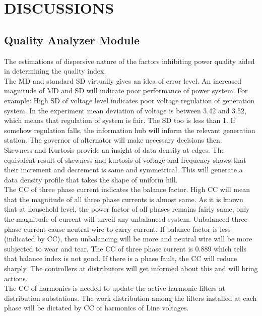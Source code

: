 \documentclass[a4paper,12pt,oneside]{book}
\begin{document}
\chapter{DISCUSSIONS} \label{chap:disc}
\label{sec:discussion}

\section*{Quality Analyzer Module}
The estimations of dispersive nature of the factors inhibiting power quality aided in determining the quality index.\\
The MD and standard SD virtually gives an idea of error level. An increased magnitude of MD and SD will indicate poor performance of power system. For example: High SD of voltage level indicates poor voltage regulation of generation system.  In the experiment mean deviation of voltage is between 3.42 and 3.52, which  means that regulation of system is fair. The SD too is less than 1. If somehow regulation falls, the information hub will inform the relevant generation station. The governor of alternator will make necessary decisions then.\\
Skewness and Kurtosis provide an insight of data density at edges. The equivalent result of skewness and kurtosis of voltage and frequency shows that their increment and decrement is same and symmetrical. This will generate a data density profile that takes the shape of uniform hill.\\
The CC of three phase current indicates the balance factor. High CC will mean that the magnitude of all three phase currents is almost same. As it is known that at household level, the power factor of all phases remains fairly same, only the magnitude of current will unveil any unbalanced system. Unbalanced three phase current cause neutral wire to carry current. If balance factor is less (indicated by CC), then unbalancing will be more and neutral wire will be more subjected to wear and tear. The CC of three phase current is 0.889 which tells that balance index is not good. If  there is a phase fault, the CC will reduce sharply. The controllers at distributors will get informed about this and will bring actions.\\
The CC of harmonics is needed to update the active harmonic filters at distribution substations. The work distribution among the filters installed at each phase will be dictated by CC of harmonics of Line voltages.
\newpage
\end{document}
